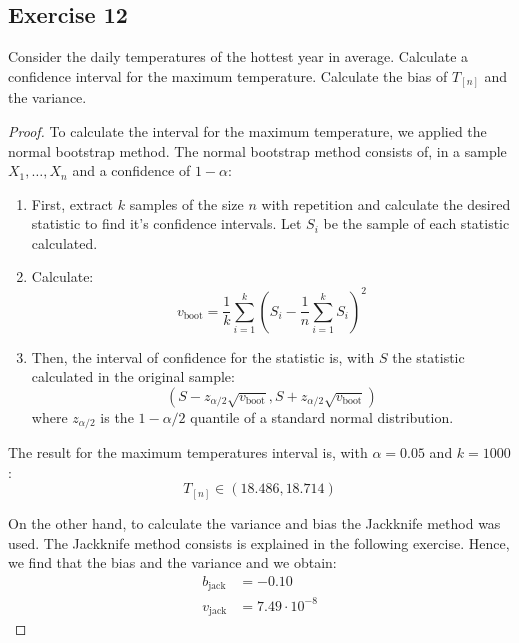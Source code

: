 \documentclass[11pt]{article}
\theoremstyle{definition}
\theoremstyle{remark}
\theoremstyle{remark}
\begin{document}
\subsection*{Exercise 12}
Consider the daily temperatures of the hottest year in
average. Calculate a confidence interval for the maximum
temperature. Calculate the bias of $T_{[n]}$ and the variance.

\begin{proof}
  To calculate the interval for the maximum temperature, we applied
  the normal bootstrap method. The normal bootstrap method consists
  of, in a sample $X_1, \ldots, X_n$ and a confidence of $1 - \alpha$:
  \begin{enumerate}
  \item First, extract $k$ samples of the size $n$ with repetition and
    calculate the desired statistic to find it's confidence
    intervals.  Let $S_i$ be the sample of each statistic calculated.
  \item Calculate:
    \begin{equation*}
      v_{\text{boot}} = \frac{1}{k} \sum_{i=1}^k\left(S_i - \frac{1}{n}
        \sum_{i=1}^k S_i\right)^2
     \end{equation*}
   \item Then, the interval of confidence for the statistic is, with
     $S$ the statistic calculated in the original sample:
     \begin{equation*}
       (S - z_{\alpha/2} \sqrt{v_{\text{boot}}} , S + z_{\alpha/2} \sqrt{v_{\text{boot}}})
     \end{equation*}
     where $z_{\alpha/2}$ is the $1 - \alpha / 2$ quantile of a
     standard normal distribution.
   \end{enumerate}
   The result for the maximum temperatures interval is, with
   $\alpha=0.05$ and $k = 1000$:
   \begin{equation*}
     T_{[n]} \in (18.486, 18.714)
   \end{equation*}

   On the other hand, to calculate the variance and bias the Jackknife
   method was used. The Jackknife method consists is explained in the
   following exercise. Hence, we find that the bias and the variance
   and we obtain:
   \begin{align*}
     b_{\text{jack}} &= -0.10 \\
     v_{\text{jack}} &= 7.49 \cdot 10^{-8}
   \end{align*}
 \end{proof}
\end{document}
